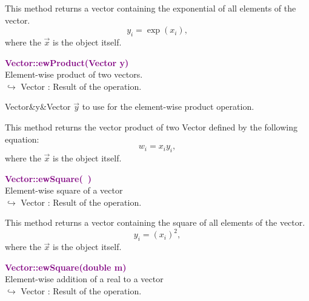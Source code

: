 This method returns a vector containing the exponential of all elements of the vector.
\begin{equation*}
y_i = \exp(x_i),
\end{equation*}
where the $\overrightarrow{x}$ is the object itself.

\textcolor{purple}{\textbf{Vector::ewProduct(Vector y)}}\label{Vector::ewProduct(Vector y)}\\
Element-wise product of two vectors.\\ \hspace*{10mm}$\hookrightarrow$ Vector : Result of the operation.

\begin{tcolorbox}[width=\textwidth,myArgs,tabularx={ll|R}]
Vector&y&Vector $\overrightarrow{y}$ to use for the element-wise product operation.
\end{tcolorbox}

This method returns the vector product of two Vector defined by the following equation:
\begin{equation*}
w_i = x_i y_i,
\end{equation*}
where the $\overrightarrow{x}$ is the object itself.

\textcolor{purple}{\textbf{Vector::ewSquare(~)}}\label{Vector::ewSquare()}\\
Element-wise square of a vector\\ \hspace*{10mm}$\hookrightarrow$ Vector : Result of the operation.

This method returns a vector containing the square of all elements of the vector.
\begin{equation*}
y_i = (x_i)^2,
\end{equation*}
where the $\overrightarrow{x}$ is the object itself.

\textcolor{purple}{\textbf{Vector::ewSquare(double m)}}\label{Vector::ewSquare(double m)}\\
Element-wise addition of a real to a vector\\ \hspace*{10mm}$\hookrightarrow$ Vector : Result of the operation.

